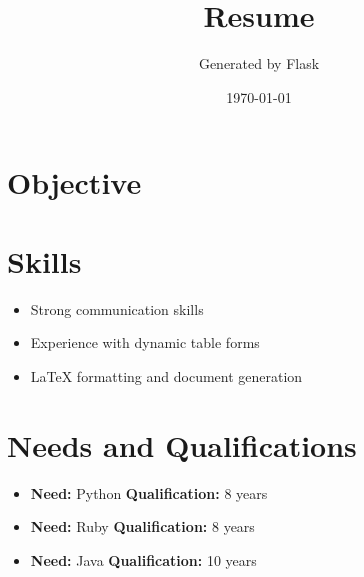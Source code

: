 \documentclass[a4paper,10pt]{article}
\begin{document}
\title{Resume}
\author{Generated by Flask}
\date{\today}
\maketitle

\section*{Objective}

\section*{Skills}
\begin{itemize}
    \item Strong communication skills
    \item Experience with dynamic table forms
    \item LaTeX formatting and document generation
\end{itemize}

\section*{Needs and Qualifications}
\begin{itemize}
    \item \textbf{Need:} Python \textbf{Qualification:} 8 years
    \item \textbf{Need:} Ruby \textbf{Qualification:} 8 years
    \item \textbf{Need:} Java \textbf{Qualification:} 10 years

\end{itemize}
\end{document}
